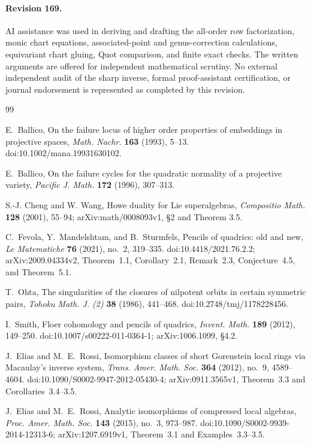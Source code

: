 \documentclass[11pt,reqno]{amsart}
\numberwithin{equation}{section}
\theoremstyle{definition}\newtheorem{definition}[theorem]{Definition}
\theoremstyle{remark}\newtheorem{remark}[theorem]{Remark}
\begin{document}
\paragraph{Revision 169.}
AI assistance was used in deriving and drafting the all-order row
factorization, monic chart equations, associated-point and genus-correction
calculations, equivariant chart gluing, Quot comparison, and finite exact
checks. The written arguments are offered for independent mathematical
scrutiny. No external independent audit of the sharp inverse, formal
proof-assistant certification, or journal endorsement is represented as
completed by this revision.

\begin{thebibliography}{99}

E.~Ballico,
On the failure locus of higher order properties of embeddings in
projective spaces,
\emph{Math. Nachr.} \textbf{163} (1993), 5--13.
doi:10.1002/mana.19931630102.

E.~Ballico,
On the failure cycles for the quadratic normality of a projective
variety,
\emph{Pacific J. Math.} \textbf{172} (1996), 307--313.

S.-J. Cheng and W. Wang, Howe duality for Lie superalgebras,
\emph{Compositio Math.} \textbf{128} (2001), 55--94;
arXiv:math/0008093v1, \S2 and Theorem 3.5.

C.~Fevola, Y.~Mandelshtam, and B.~Sturmfels,
Pencils of quadrics: old and new,
\emph{Le Matematiche} \textbf{76} (2021), no.~2, 319--335.
doi:10.4418/2021.76.2.2; arXiv:2009.04334v2,
Theorem~1.1, Corollary~2.1, Remark~2.3, Conjecture~4.5, and Theorem~5.1.

T.~Ohta, The singularities of the closures of nilpotent orbits in certain
symmetric pairs, \emph{Tohoku Math. J. (2)} \textbf{38} (1986), 441--468.
doi:10.2748/tmj/1178228456.

I.~Smith, Floer cohomology and pencils of quadrics,
\emph{Invent. Math.} \textbf{189} (2012), 149--250.
doi:10.1007/s00222-011-0364-1; arXiv:1006.1099, \S4.2.

J.~Elias and M.~E.~Rossi,
Isomorphism classes of short Gorenstein local rings via Macaulay's
inverse system,
\emph{Trans. Amer. Math. Soc.} \textbf{364} (2012), no.~9, 4589--4604.
doi:10.1090/S0002-9947-2012-05430-4;
arXiv:0911.3565v1, Theorem~3.3 and Corollaries~3.4--3.5.

J.~Elias and M.~E.~Rossi,
Analytic isomorphisms of compressed local algebras,
\emph{Proc. Amer. Math. Soc.} \textbf{143} (2015), no.~3, 973--987.
doi:10.1090/S0002-9939-2014-12313-6;
arXiv:1207.6919v1, Theorem~3.1 and Examples~3.3--3.5.


\end{thebibliography}
\end{document}
